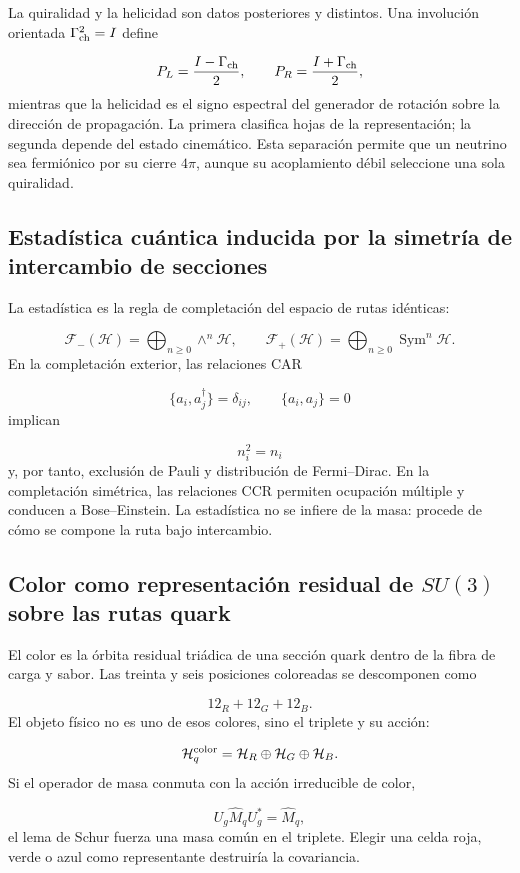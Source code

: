 La quiralidad y la helicidad son datos posteriores y distintos. Una involución orientada \(\Gamma_{\rm ch}^2=I\) define

\[
 P_L=\frac{I-\Gamma_{\rm ch}}2,
 \qquad
 P_R=\frac{I+\Gamma_{\rm ch}}2,
\]
mientras que la helicidad es el signo espectral del generador de rotación sobre la dirección de propagación. La primera clasifica hojas de la representación; la segunda depende del estado cinemático. Esta separación permite que un neutrino sea fermiónico por su cierre \(4\pi\), aunque su acoplamiento débil seleccione una sola quiralidad.

\subsection{Estadística cuántica inducida por la simetría de intercambio de secciones}
La estadística es la regla de completación del espacio de rutas idénticas:

\[
 \mathcal F_-(\mathcal H)
 =\bigoplus_{n\ge0}\wedge^n\mathcal H,\qquad
 \mathcal F_+(\mathcal H)
 =\bigoplus_{n\ge0}\operatorname{Sym}^n\mathcal H.
\]
En la completación exterior, las relaciones CAR

\[
 \{a_i,a_j^\dagger\}=\delta_{ij},\qquad
 \{a_i,a_j\}=0
\]
implican

\[
 n_i^2=n_i
\]
y, por tanto, exclusión de Pauli y distribución de Fermi--Dirac. En la completación simétrica, las relaciones CCR permiten ocupación múltiple y conducen a Bose--Einstein. La estadística no se infiere de la masa: procede de cómo se compone la ruta bajo intercambio.

\subsection{Color como representación residual de \(SU(3)\) sobre las rutas quark}
El color es la órbita residual triádica de una sección quark dentro de la fibra de carga y sabor. Las treinta y seis posiciones coloreadas se descomponen como

\[
 12_R+12_G+12_B.
\]
El objeto físico no es uno de esos colores, sino el triplete y su acción:

\[
 \mathcal H_q^{\rm color}
 =\mathcal H_R\oplus\mathcal H_G\oplus\mathcal H_B.
\]
Si el operador de masa conmuta con la acción irreducible de color,

\[
 U_g\widehat M_qU_g^*=\widehat M_q,
\]
el lema de Schur fuerza una masa común en el triplete. Elegir una celda roja, verde o azul como representante destruiría la covariancia.

